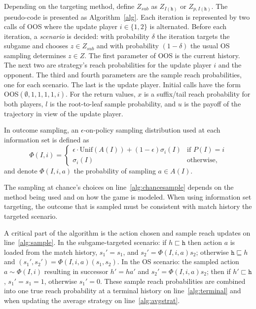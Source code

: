\documentclass[letterpaper]{article}
\newcommand{\tth}{\mathtt{h}}
\begin{document}
Depending on the targeting method, define $Z_{sub}$ as $Z_{I(\tth)}$ or $Z_{p,I(\tth)}$. 
The pseudo-code is presented as Algorithm~\ref{alg}. 
Each iteration is represented by two calls of OOS where the update player $i \in \{1,2\}$ is alternated. 
Before each iteration, a {\it scenario} is decided: 
with probability $\delta$ the iteration targets the subgame and chooses $z \in Z_{sub}$
and with probability $(1-\delta)$ the usual OS sampling determines $z \in Z$. 
The first parameter of OOS is the current history. 
The next two are strategy's reach probabilities for the update player $i$ and the opponent. 
The third and fourth parameters are the sample reach probabilities, one for each scenario. 
The last is the update player. Initial calls have the form OOS$(\emptyset, 1, 1, 1, 1, i)$.  
For the return values, $x$ is a suffix/tail reach probability for both players, 
$l$ is the root-to-leaf sample probability, and $u$ is the payoff of the trajectory in view 
of the update player. 

In outcome sampling, an $\epsilon$-on-policy sampling distribution used at each information set
is defined as 
\begin{equation*}
\label{eq:ossample}
\Phi(I,i) = \left\{
\begin{array}{ll}
\epsilon \cdot \mbox{Unif}(A(I)) + (1-\epsilon)\sigma_i(I) & \mbox{if } P(I) = i\\ 
\sigma_i(I)                                          & \mbox{otherwise,}
\end{array} \right.
\end{equation*}
and denote $\Phi(I,i,a)$ the probability of sampling $a \in A(I)$. 

The sampling at chance's choices on line~\ref{alg:chancesample} depends on the method being 
used and on how the game is modeled. When using information set targeting, the outcome that is sampled 
must be consistent with match history the targeted scenario. 

A critical part of the algorithm is the action chosen and sample reach updates on line~\ref{alg:sample}. 
In the subgame-targeted scenario: if $h \sqsubset \tth$ then action $a$ is loaded from the match history, $s_1' = s_1$, 
and $s_2' = \Phi(I,i,a) s_2$; otherwise $\tth \sqsubseteq h$ and $(s_1', s_2') = \Phi(I,i,a) (s_1, s_2)$. 
In the OS scenario: the sampled action $a \sim \Phi(I,i)$ resulting in successor $h' = ha'$ and $s_2' = \Phi(I,i,a) s_2$; 
then if $h' \sqsubset \tth$, $s_1' = s_1 = 1$, otherwise $s_1' = 0$. These sample reach probabilities are combined into 
one true reach probability at a terminal history on line~\ref{alg:terminal} and when updating the average 
strategy on line~\ref{alg:avgstrat}. 
\end{document}
